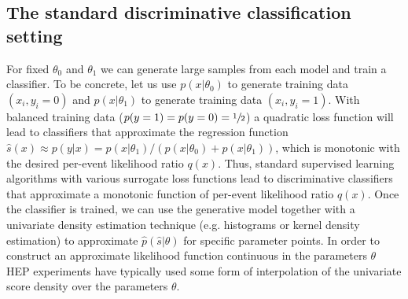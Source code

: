 \documentclass[aoas,preprint]{imsart}
\numberwithin{equation}{section}
\theoremstyle{plain}
\begin{document}
\subsection{The standard discriminative classification setting} 
For fixed $\theta_0$ and $\theta_1$ we can generate 
large samples from each model and train a classifier. To be concrete, let us use $p(x|\theta_0)$ to generate training 
data $(x_i,  y_i=0)$ and $p(x|\theta_1)$ to generate training data $(x_i , y_i=1)$. With balanced training data   ($p(y=1)=p(y=0)=\sfrac{1}{2}$) a quadratic loss function will lead to classifiers that approximate the regression function  $\hat{s}(x) \approx p(y|x) = p(x|\theta_1)/(p(x|\theta_0)+p(x|\theta_1))$, which is  monotonic with the desired per-event likelihood ratio $q(x)$. Thus, standard supervised learning algorithms with various surrogate loss functions lead to discriminative classifiers that approximate a monotonic function of per-event likelihood ratio $q(x)$.  Once the classifier is trained, we can use the generative model together with a univariate density estimation technique (e.g. histograms or kernel density estimation) to approximate $\hat{p}(\hat{s}|\theta)$ for specific parameter points. In order to construct an approximate likelihood function continuous in the parameters $\theta$ HEP experiments have typically used some form of interpolation of the univariate score density over the parameters $\theta$. 


%
%
\end{document}
